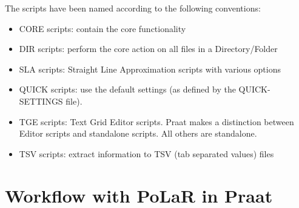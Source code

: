 \documentclass[11pt, twoside]{memoir}
\begin{document}
The scripts have been named according to the following conventions:

\begin{itemize}
	\item CORE scripts: contain the core functionality 
	\item DIR scripts: perform the core action on all files in a Directory\slash Folder
	\item SLA scripts: Straight Line Approximation scripts with various options
	\item QUICK scripts: use the default settings (as defined by the QUICK-SETTINGS file).
	\item TGE scripts: Text Grid Editor scripts. Praat makes a distinction between Editor scripts and standalone scripts. All others are standalone. 
	\item TSV scripts: extract information to TSV (tab separated values) files
\end{itemize}


\section{Workflow with PoLaR in Praat}\label{sec:workflow-with-polar-in-praat}
\end{document}
